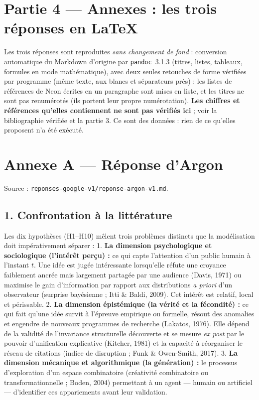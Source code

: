 \documentclass[a4paper,11pt]{article}
\begin{document}
\section*{Partie 4 — Annexes : les trois réponses en \LaTeX{}}
Les trois réponses sont reproduites \emph{sans changement de fond} : conversion automatique du Markdown d'origine par \texttt{pandoc}~3.1.3 (titres, listes, tableaux, formules en mode mathématique), avec deux seules retouches de forme vérifiées par programme (même texte, aux blancs et séparateurs près) : les listes de références de Neon écrites en un paragraphe sont mises en liste, et les titres ne sont pas renumérotés (ils portent leur propre numérotation). \textbf{Les chiffres et références qu'elles contiennent ne sont pas vérifiés ici} ; voir la bibliographie vérifiée et la partie 3. Ce sont des données : rien de ce qu'elles proposent n'a été exécuté.
\clearpage
\section*{Annexe A — Réponse d'Argon}
{\small Source : \texttt{reponses-google-v1/reponse-argon-v1.md}.}\par
\subsection*{1. Confrontation à la littérature}

Les dix hypothèses (H1--H10) mêlent trois problèmes distincts que la
modélisation doit impérativement séparer : 1. \textbf{La dimension
psychologique et sociologique (l'intérêt perçu) :} ce qui capte
l'attention d'un public humain à l'instant \(t\). Une idée est jugée
intéressante lorsqu'elle réfute une croyance faiblement ancrée mais
largement partagée par une audience (Davis, 1971) ou maximise le gain
d'information par rapport aux distributions \emph{a priori} d'un
observateur (surprise bayésienne ; Itti \& Baldi, 2009). Cet intérêt est
relatif, local et périssable. 2. \textbf{La dimension épistémique (la
vérité et la fécondité) :} ce qui fait qu'une idée survit à l'épreuve
empirique ou formelle, résout des anomalies et engendre de nouveaux
programmes de recherche (Lakatos, 1976). Elle dépend de la validité de
l'invariance structurelle découverte et se mesure \emph{ex post} par le
pouvoir d'unification explicative (Kitcher, 1981) et la capacité à
réorganiser le réseau de citations (indice de disruption ; Funk \&
Owen-Smith, 2017). 3. \textbf{La dimension mécanique et algorithmique
(la génération) :} le processus d'exploration d'un espace combinatoire
(créativité combinatoire ou transformationnelle ; Boden, 2004)
permettant à un agent --- humain ou artificiel --- d'identifier ces
appariements avant leur validation.
\end{document}
